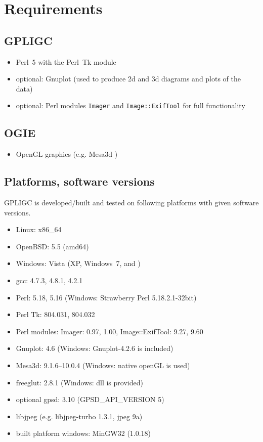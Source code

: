 \section{Requirements}
\label{requirements}

\subsection*{GPLIGC}

\begin{itemize}
\item Perl~5 with the Perl~Tk module \cite{perl,perltk}
\item {\scriptsize optional:} Gnuplot \cite{gnuplot} (used to produce 2d and 3d diagrams and plots of the data)
\item {\scriptsize optional:} Perl modules \texttt{Imager} \cite{imager} and \texttt{Image::ExifTool} \cite{exiftool} for full functionality
\end{itemize}


\subsection*{OGIE}

\begin{itemize}
\item OpenGL graphics (e.g. Mesa3d \cite{mesa})
\end{itemize}


\subsection*{Platforms, software versions}
GPLIGC is developed/built and tested on following platforms with given software versions.

\begin{itemize}
\item Linux: x86\_64
\item OpenBSD: 5.5 (amd64)
\item Windows: Vista (XP, Windows~7, and )
\item gcc: 4.7.3, %
4.8.1, %
4.2.1 %
\item Perl: 5.18, %
5.16 %
(Windows: Strawberry Perl 5.18.2.1-32bit)
\item Perl Tk: 804.031, 804.032
\item Perl modules: Imager: 0.97, 1.00, %
Image::ExifTool: 9.27, 9.60
\item Gnuplot: 4.6 (Windows: Gnuplot-4.2.6 is included)
\item Mesa3d: 9.1.6--10.0.4 (Windows: native openGL is used)
\item freeglut: 2.8.1 (Windows: dll is provided)
\item {\scriptsize optional} gpsd: 3.10 (GPSD\_API\_VERSION 5)
\item libjpeg (e.g. libjpeg-turbo 1.3.1, jpeg 9a)
\item built platform windows: MinGW32 (1.0.18)
\end{itemize}


